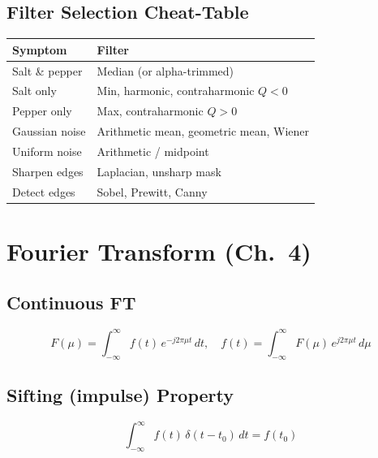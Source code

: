 \documentclass[10pt]{article}
\begin{document}
\subsection{Filter Selection Cheat-Table}
\begin{tcolorbox}[studybox]
\begin{tabular}{@{}ll@{}}
\toprule
\textbf{Symptom} & \textbf{Filter} \\
\midrule
Salt \& pepper & Median (or alpha-trimmed) \\
Salt only & Min, harmonic, contraharmonic $Q<0$ \\
Pepper only & Max, contraharmonic $Q>0$ \\
Gaussian noise & Arithmetic mean, geometric mean, Wiener \\
Uniform noise & Arithmetic / midpoint \\
Sharpen edges & Laplacian, unsharp mask \\
Detect edges & Sobel, Prewitt, Canny \\
\bottomrule
\end{tabular}
\end{tcolorbox}

\section{Fourier Transform (Ch.~4)}

\subsection{Continuous FT}
\begin{tcolorbox}[studybox]
\[
F(\mu) = \int_{-\infty}^{\infty} f(t)\, e^{-j2\pi\mu t}\, dt,
\quad
f(t) = \int_{-\infty}^{\infty} F(\mu)\, e^{j2\pi\mu t}\, d\mu
\]
\end{tcolorbox}

\subsection{Sifting (impulse) Property}
\[
\int_{-\infty}^{\infty} f(t)\,\delta(t-t_0)\,dt = f(t_0)
\]
\end{document}
